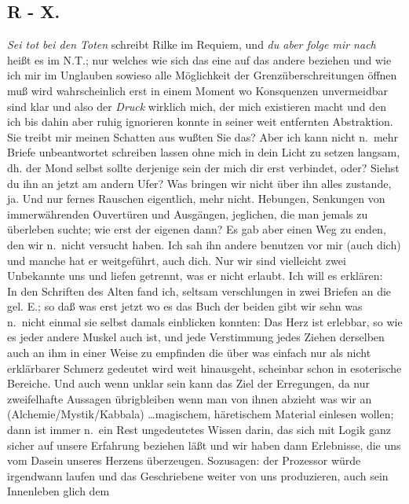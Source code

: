\documentclass[
]{article}
\author{}
\date{\vspace{-2.5em}}
\begin{document}
\subsection{R - X.}\label{r---x.}

\emph{Sei tot bei den Toten} schreibt Rilke im Requiem, und \emph{du
aber folge mir nach} heißt es im N.T.; nur welches wie sich das eine auf
das andere beziehen und wie ich mir im Unglauben sowieso alle
Möglichkeit der Grenzüberschreitungen öffnen muß wird wahrscheinlich
erst in einem Moment wo Konsquenzen unvermeidbar sind klar und also der
\emph{Druck} wirklich mich, der mich existieren macht und den ich bis
dahin aber ruhig ignorieren konnte in seiner weit entfernten
Abstraktion.\\
Sie treibt mir meinen Schatten aus wußten Sie das? Aber ich kann nicht
n.~mehr Briefe unbeantwortet schreiben lassen ohne mich in dein Licht zu
setzen langsam, dh. der Mond selbst sollte derjenige sein der mich dir
erst verbindet, oder? Siehst du ihn an jetzt am andern Ufer? Was bringen
wir nicht über ihn alles zustande, ja. Und nur fernes Rauschen
eigentlich, mehr nicht. Hebungen, Senkungen von immerwährenden
Ouvertüren und Ausgängen, jeglichen, die man jemals zu überleben suchte;
wie erst der eigenen dann? Es gab aber einen Weg zu enden, den wir
n.~nicht versucht haben. Ich sah ihn andere benutzen vor mir (auch dich)
und manche hat er weitgeführt, auch dich. Nur wir sind vielleicht zwei
Unbekannte uns und liefen getrennt, was er nicht erlaubt. Ich will es
erklären:\\
In den Schriften des Alten fand ich, seltsam verschlungen in zwei
Briefen an die gel. E.; so daß was erst jetzt wo es das Buch der beiden
gibt wir sehn was n.~nicht einmal sie selbst damals einblicken konnten:
Das Herz ist erlebbar, so wie es jeder andere Muskel auch ist, und jede
Verstimmung jedes Ziehen derselben auch an ihm in einer Weise zu
empfinden die über was einfach nur als nicht erklärbarer Schmerz
gedeutet wird weit hinausgeht, scheinbar schon in esoterische Bereiche.
Und auch wenn unklar sein kann das Ziel der Erregungen, da nur
zweifelhafte Aussagen übrigbleiben wenn man von ihnen abzieht was wir an
(Alchemie/Mystik/Kabbala) \ldots magischem, häretischem Material
einlesen wollen; dann ist immer n.~ein Rest ungedeutetes Wissen darin,
das sich mit Logik ganz sicher auf unsere Erfahrung beziehen läßt und
wir haben dann Erlebnisse, die uns vom Dasein unseres Herzens
überzeugen. Sozusagen: der Prozessor würde irgendwann laufen und das
Geschriebene weiter von uns produzieren, auch sein Innenleben glich dem
\end{document}
